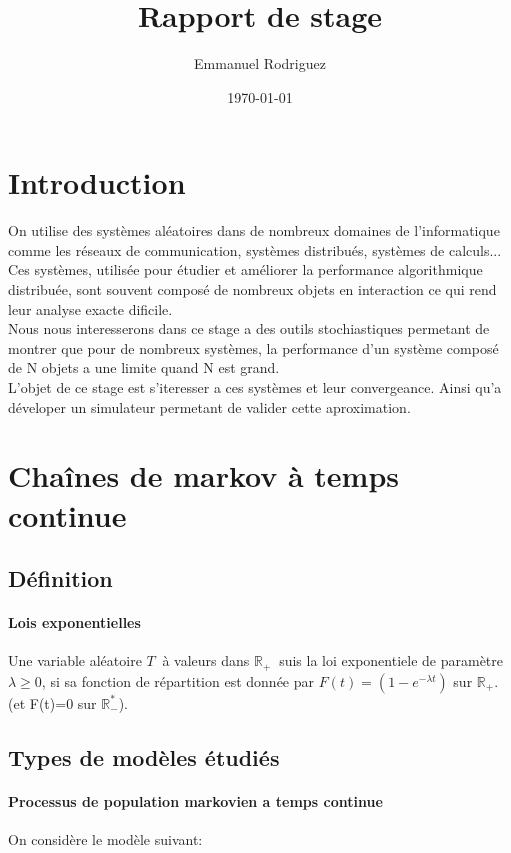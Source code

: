 \documentclass[a4paper]{article}
\date{\today}
\title{Rapport de stage}
\author{Emmanuel Rodriguez}
\begin{document}
\lstset{language=Python} 

\maketitle

\section{Introduction}

On utilise des systèmes aléatoires dans de nombreux domaines de
l'informatique comme les réseaux de communication, systèmes
distribués, systèmes de calculs... Ces systèmes, utilisée pour étudier
et améliorer la performance algorithmique distribuée, sont souvent
composé de nombreux objets en interaction ce qui rend leur analyse
exacte dificile. \\
\smallbreak
Nous nous interesserons dans ce stage a des outils
stochiastiques permetant de montrer que pour de nombreux systèmes, la
performance d'un système composé de N objets a une limite quand N est grand. \\
L'objet de ce stage est s'iteresser a ces systèmes et leur
convergeance. Ainsi qu'a déveloper un simulateur permetant de valider
cette aproximation.

\section{Chaînes de markov à temps continue}
\cite{courscmtc}

\subsection{Définition}

\paragraph{Lois exponentielles}
Une variable aléatoire $T \ $ à valeurs dans $\mathbb{R}_+ \ $ suis la
loi exponentiele de paramètre $\lambda \geq 0$, si  sa fonction de
répartition est donnée par $F(t)=(1-e^{-\lambda t})$ sur
$\mathbb{R}_+$. (et F(t)=0 sur $\mathbb{R}_-^*$).


\subsection{Types de modèles étudiés}
\paragraph{Processus de population markovien a temps continue}
On considère le modèle suivant:
\end{document}
